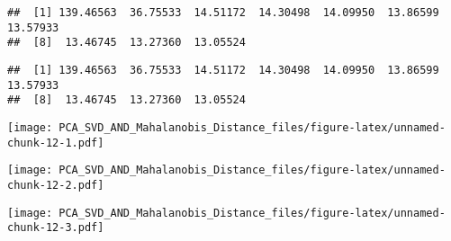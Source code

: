 \documentclass[]{article}
\newenvironment{Shaded}{\begin{snugshade}}{\end{snugshade}}
\newcommand{\KeywordTok}[1]{\textcolor[rgb]{0.13,0.29,0.53}{\textbf{{#1}}}}
\newcommand{\DataTypeTok}[1]{\textcolor[rgb]{0.13,0.29,0.53}{{#1}}}
\newcommand{\DecValTok}[1]{\textcolor[rgb]{0.00,0.00,0.81}{{#1}}}
\newcommand{\StringTok}[1]{\textcolor[rgb]{0.31,0.60,0.02}{{#1}}}
\newcommand{\NormalTok}[1]{{#1}}
\begin{document}
\begin{verbatim}
##  [1] 139.46563  36.75533  14.51172  14.30498  14.09950  13.86599  13.57933
##  [8]  13.46745  13.27360  13.05524
\end{verbatim}

\begin{Shaded}
\end{Shaded}

\begin{verbatim}
##  [1] 139.46563  36.75533  14.51172  14.30498  14.09950  13.86599  13.57933
##  [8]  13.46745  13.27360  13.05524
\end{verbatim}

\begin{Shaded}
\end{Shaded}

\texttt{[image: PCA\_SVD\_AND\_Mahalanobis\_Distance\_files/figure-latex/unnamed-chunk-12-1.pdf]}

\begin{Shaded}
\end{Shaded}

\texttt{[image: PCA\_SVD\_AND\_Mahalanobis\_Distance\_files/figure-latex/unnamed-chunk-12-2.pdf]}

\begin{Shaded}
\end{Shaded}

\texttt{[image: PCA\_SVD\_AND\_Mahalanobis\_Distance\_files/figure-latex/unnamed-chunk-12-3.pdf]}
\end{document}
